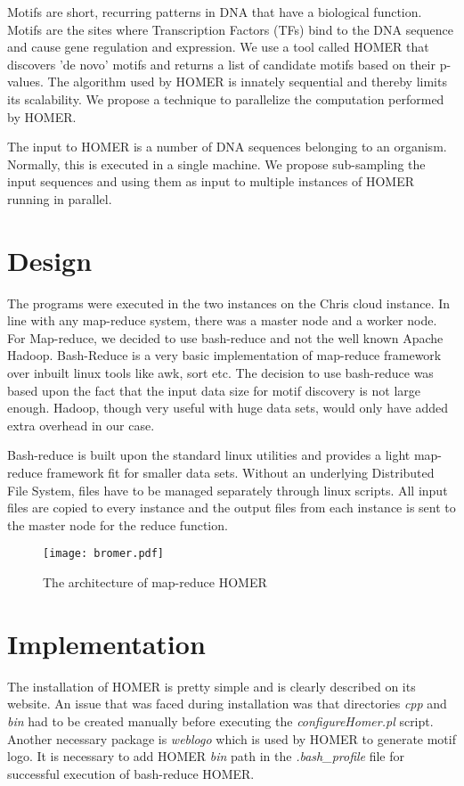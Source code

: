\documentclass{acm_proc_article-sp}
\begin{document}
Motifs are short, recurring patterns in DNA that have a biological function. Motifs are the sites where Transcription Factors (TFs) bind to the DNA sequence and cause gene regulation and expression. We use a tool called HOMER that discovers 'de novo' motifs and returns a list of candidate motifs based on their p-values. The algorithm used by HOMER is innately sequential and thereby limits its scalability. We propose a technique to parallelize the computation performed by HOMER.

The input to HOMER is a number of DNA sequences belonging to an organism. Normally, this is executed in a single machine. We propose sub-sampling the input sequences and using them as input to multiple instances of HOMER running in parallel.  

\section{Design}
The programs were executed in the two instances on the Chris cloud instance. In line with any map-reduce system, there was a master node and a worker node. For Map-reduce, we decided to use bash-reduce and not the well known Apache Hadoop. Bash-Reduce is a very basic implementation of map-reduce framework over inbuilt linux tools like awk, sort etc. The decision to use bash-reduce was based upon the fact that the input data size for motif discovery is not large enough. Hadoop, though very useful with huge data sets, would only have added extra overhead in our case.

Bash-reduce is built upon the standard linux utilities and provides a light map-reduce framework fit for smaller data sets. Without an underlying Distributed File System, files have to be managed separately through linux scripts. All input files are copied to every instance and the output files from each instance is sent to the master node for the reduce function. 
\begin{figure}
\centering
\texttt{[image: bromer.pdf]} 
\caption{The architecture of map-reduce HOMER}
\end{figure}


\section{Implementation}
The installation of HOMER is pretty simple and is clearly described on its website. An issue that was faced during installation was that directories \textit{cpp} and \textit{bin} had to be created manually before executing the \textit{configureHomer.pl} script. Another necessary package is \textit{weblogo} which is used by HOMER to generate motif logo. It is necessary to add HOMER \textit{bin} path in the \textit{.bash\_profile} file for successful execution of bash-reduce HOMER.
\end{document}
